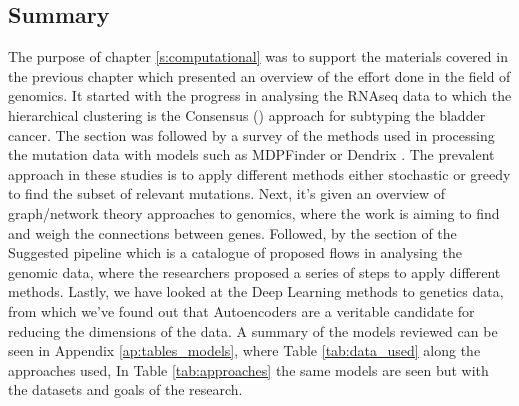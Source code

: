 





\subsection{Summary}

The purpose of chapter \ref{s:computational} was to support the materials covered in the previous chapter which presented an overview of the effort done in the field of genomics. It started with the progress in analysing the RNAseq data to which the hierarchical clustering is the Consensus (\citet{Kamoun2020-tj}) approach for subtyping the bladder cancer. The section was followed by a survey of the methods used in processing the mutation data with models such as MDPFinder \citet{Zhao2012-wj} or Dendrix \citet{Vandin2012-cf}. The prevalent approach in these studies is to apply different methods either stochastic or greedy to find the subset of relevant mutations. Next, it's given an overview of graph/network theory approaches to genomics, where the work is aiming to find and weigh the connections between genes. Followed, by the section of the Suggested pipeline which is a catalogue of proposed flows in analysing the genomic data, where the researchers proposed a series of steps to apply different methods. Lastly, we have looked at the Deep Learning methods to genetics data, from which we've found out that Autoencoders are a veritable candidate for reducing the dimensions of the data. A summary of the models reviewed can be seen in Appendix \ref{ap:tables_models}, where Table \ref{tab:data_used} along the approaches used, In Table \ref{tab:approaches} the same models are seen but with the datasets and goals of the research.

